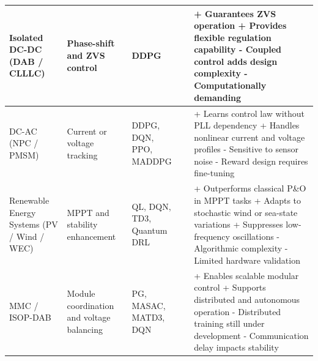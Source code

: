 \begin{table}[t]
{\begin{tabular}{@{}p{3.3cm} p{4.3cm} p{1.8cm} l p{5.8cm}@{}}
Isolated DC-DC (DAB / CLLLC) &
Phase-shift and ZVS control &
DDPG &
\cite{wu2021innovative} &
+ Guarantees ZVS operation \newline
+ Provides flexible regulation capability \newline
- Coupled control adds design complexity \newline
- Computationally demanding \\ 
\midrule

DC-AC (NPC / PMSM) &
Current or voltage tracking &
DDPG, DQN, PPO, \newline
MADDPG &
\cite{book2021transferring,schenke2021deep,traue2020toward,qashqai2023model,weber2023steady,yan2022multiagent,pinthurat2023simultaneous} &
+ Learns control law without PLL dependency \newline
+ Handles nonlinear current and voltage profiles \newline
- Sensitive to sensor noise \newline
- Reward design requires fine-tuning \\ 
\midrule

Renewable Energy Systems (PV / Wind / WEC) &
MPPT and stability enhancement &
QL, DQN, \newline
TD3, \newline
Quantum DRL &
\cite{wei2015reinforcement,arianborna2023mppt,kosuru2022deep,yin2021quantum,zou2022optimization,chen2024control} &
+ Outperforms classical P\&O in MPPT tasks \newline
+ Adapts to stochastic wind or sea-state variations \newline
+ Suppresses low-frequency oscillations \newline
- Algorithmic complexity \newline
- Limited hardware validation \\ 
\midrule

MMC / ISOP-DAB &
Module coordination and voltage balancing &
PG, MASAC, \newline
MATD3, DQN &
\cite{jiang2021application,jung2022reinforcement,zeng2021deep,zeng2022multiagent,zeng2022autonomous,zeng2023deep} &
+ Enables scalable modular control \newline
+ Supports distributed and autonomous operation \newline
- Distributed training still under development \newline
- Communication delay impacts stability \\ 
\bottomrule
\end{tabular}}
\end{table}




